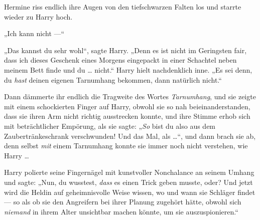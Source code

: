 Hermine riss endlich ihre Augen von den tiefschwarzen Falten los und starrte wieder zu Harry hoch.

„Ich kann nicht —“

„Das kannst du sehr wohl“, sagte Harry.
„Denn es ist nicht im Geringsten fair, dass ich dieses Geschenk eines Morgens eingepackt in einer Schachtel neben meinem Bett finde und du … nicht.“ Harry hielt nachdenklich inne.
„Es sei denn, du \emph{hast} deinen eigenen Tarnumhang bekommen, dann natürlich nicht.“

Dann dämmerte ihr endlich die Tragweite des Wortes \emph{Tarnumhang}, und sie zeigte mit einem schockierten Finger auf Harry, obwohl sie so nah beieinanderstanden, dass sie ihren Arm nicht richtig ausstrecken konnte, und ihre Stimme erhob sich mit beträchtlicher Empörung, als sie sagte:
„\emph{So} bist du also aus dem Zaubertränkeschrank verschwunden! Und das Mal, als …“, und dann brach sie ab, denn selbst \emph{mit} einem Tarnumhang konnte sie immer noch nicht verstehen, wie Harry …

Harry polierte seine Fingernägel mit kunstvoller Nonchalance an seinem Umhang und sagte:
„Nun, du wusstest, \emph{dass} es einen Trick geben musste, oder? Und jetzt wird die Heldin auf geheimnisvolle Weise wissen, wo und wann sie Schläger findet — so als ob sie den Angreifern bei ihrer Planung zugehört hätte, obwohl sich \emph{niemand} in ihrem Alter unsichtbar machen könnte, um sie auszuspionieren.“

